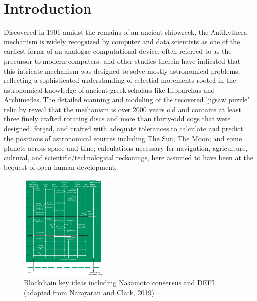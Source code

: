 \documentclass[final,5p,times,twocolumn,authoryear]{elsarticle}
\begin{document}
\section{Introduction}
\label{sec:intro}
%
Discovered in 1901 amidst the remains of an ancient shipwreck, the Antikythera mechanism is widely recognized by computer and data scientists as one of the earliest forms of an analogue computational device, often referred to as the precursor to modern computers. \cite{Freeth2021} and other studies therein have indicated that this intricate mechanism was designed to solve mostly astronomical problems, reflecting a sophisticated understanding of celestial movements rooted in the astronomical knowledge of ancient greek scholars like Hipparchus and Archimedes. The detailed scanning and modeling of the recovered 'jigsaw puzzle' relic by \cite{Freeth2021} reveal that the mechanism is over 2000 years old and contains at least three finely crafted rotating discs and more than thirty-odd cogs that were designed, forged, and crafted with adequate tolerances to calculate and predict the positions of astronomical sources including The Sun; The Moon; and some planets across space and time; calculations necessary for navigation, agriculture, cultural, and scientific/technological reckonings, here assumed to have been at the bequest of open human development.
 
 \begin{figure}
    \centering
    \includegraphics[width=0.38\textwidth]{narayanan3.png}
    \vspace*{-0.3cm}
    \caption{Blockchain key ideas including Nakamoto consensus and DEFI (adapted from Narayaran and Clark, 2019)}
    \label{fig:narayanan}
\end{figure}
 
\end{document}
